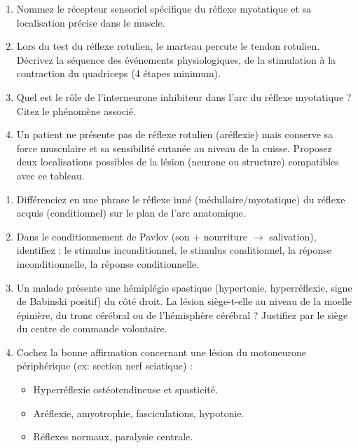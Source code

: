 \documentclass[11pt]{article}
\begin{document}
\begin{exercice}
\begin{enumerate}
    \item Nommez le récepteur sensoriel spécifique du réflexe myotatique et sa localisation précise dans le muscle.
    \item Lors du test du réflexe rotulien, le marteau percute le tendon rotulien. Décrivez la séquence des événements physiologiques, de la stimulation à la contraction du quadriceps (4 étapes minimum).
    \item Quel est le rôle de l'interneurone inhibiteur dans l'arc du réflexe myotatique ? Citez le phénomène associé.
    \item Un patient ne présente pas de réflexe rotulien (aréflexie) mais conserve sa force musculaire et sa sensibilité cutanée au niveau de la cuisse. Proposez deux localisations possibles de la lésion (neurone ou structure) compatibles avec ce tableau.
\end{enumerate}
\end{exercice}

\begin{exercice}
\begin{enumerate}
    \item Différenciez en une phrase le réflexe inné (médullaire/myotatique) du réflexe acquis (conditionnel) sur le plan de l'arc anatomique.
    \item Dans le conditionnement de Pavlov (son + nourriture $\rightarrow$ salivation), identifiez : le stimulus inconditionnel, le stimulus conditionnel, la réponse inconditionnelle, la réponse conditionnelle.
    \item Un malade présente une hémiplégie spastique (hypertonie, hyperréflexie, signe de Babinski positif) du côté droit. La lésion siège-t-elle au niveau de la moelle épinière, du tronc cérébral ou de l'hémisphère cérébral ? Justifiez par le siège du centre de commande volontaire.
    \item Cochez la bonne affirmation concernant une lésion du motoneurone périphérique (ex: section nerf sciatique) :
    \begin{itemize}
        \item[a)] Hyperréflexie ostéotendineuse et spasticité.
        \item[b)] Aréflexie, amyotrophie, fasciculations, hypotonie.
        \item[c)] Réflexes normaux, paralysie centrale.
    \end{itemize}
\end{enumerate}
\end{exercice}
\end{document}
